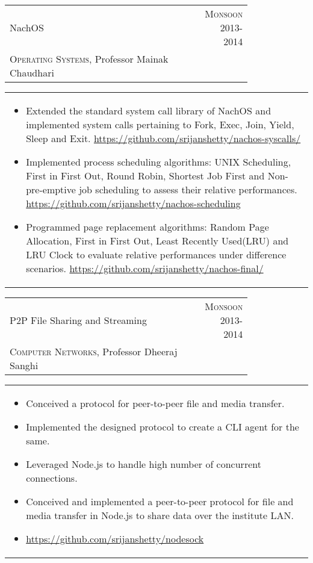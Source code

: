 \documentclass[a4paper,10pt]{article} %
\newcommand{\lproject}[4]{
    \begin{tabular}{p{0.80\linewidth}r}
        \textcolor{NavyBlue}{#2} & \multicolumn{1}{m{4cm}}{\raggedleft \textsc{#1}}\\
        #3
    \end{tabular}
    \begin{tabular}{p{\linewidth}}
    \vspace{-0.3cm}
        \footnotesize{#4}
    \end{tabular}
    \vspace{-0.5cm}
}
\begin{document}
\lproject {Monsoon 2013-2014}
          {NachOS}
          {\textsc{Operating Systems}, Professor Mainak Chaudhari}
          {
             \begin{itemize}[leftmargin=0.5cm]
                 \item Extended the standard system call library of NachOS and implemented system calls pertaining to Fork, Exec,
                     Join, Yield, Sleep and Exit.
                     \href{https://github.com/srijanshetty/nachos-syscalls/}{https://github.com/srijanshetty/nachos-syscalls/}
                 \item Implemented process scheduling algorithms: UNIX Scheduling, First in First Out,
                     Round Robin, Shortest Job First and Non-pre-emptive job scheduling to assess their relative performances.
                     \href{https://github.com/srijanshetty/nachos-scheduling}{https://github.com/srijanshetty/nachos-scheduling}
                 \item Programmed page replacement algorithms: Random Page Allocation, First in First Out,
                     Least Recently Used(LRU) and LRU Clock to evaluate relative performances under difference scenarios.
                     \href{https://github.com/srijanshetty/nachos-final/}{https://github.com/srijanshetty/nachos-final/}
              \end{itemize}
          }

\lproject {Monsoon 2013-2014}
          {P2P File Sharing and Streaming}
          {\textsc{Computer Networks}, Professor Dheeraj Sanghi}
          {
             \begin{itemize}[leftmargin=0.5cm]
                 \item Conceived a protocol for peer-to-peer file and media transfer.
                 \item Implemented the designed protocol to create a CLI agent for the same.
                 \item Leveraged Node.js to handle high number of concurrent connections.
                 \item Conceived and implemented a peer-to-peer protocol for file and media transfer in Node.js to share
                     data over the institute LAN.
                 \item \href{https://github.com/srijanshetty/nodesock}{https://github.com/srijanshetty/nodesock}
             \end{itemize}
          }
\end{document}
